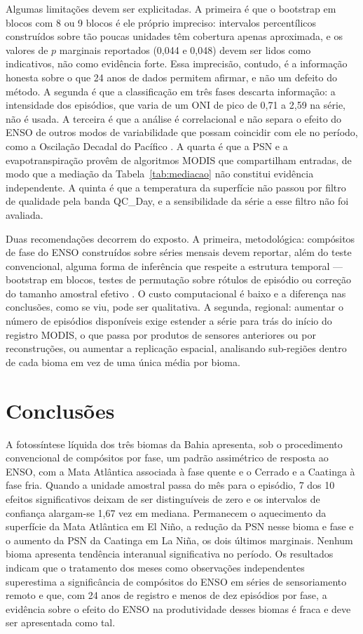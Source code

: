 \documentclass[a4paper,fleqn]{cas-sc}
\begin{document}
Algumas limitações devem ser explicitadas. A primeira é que o bootstrap em blocos com 8 ou 9 blocos é ele próprio impreciso: intervalos percentílicos construídos sobre tão poucas unidades têm cobertura apenas aproximada, e os valores de $p$ marginais reportados (0,044 e 0,048) devem ser lidos como indicativos, não como evidência forte. Essa imprecisão, contudo, é a informação honesta sobre o que 24 anos de dados permitem afirmar, e não um defeito do método. A segunda é que a classificação em três fases descarta informação: a intensidade dos episódios, que varia de um ONI de pico de 0,71 a 2,59 na série, não é usada. A terceira é que a análise é correlacional e não separa o efeito do ENSO de outros modos de variabilidade que possam coincidir com ele no período, como a Oscilação Decadal do Pacífico \citep{kayano2007}. A quarta é que a PSN e a evapotranspiração provêm de algoritmos MODIS que compartilham entradas, de modo que a mediação da Tabela~\ref{tab:mediacao} não constitui evidência independente. A quinta é que a temperatura da superfície não passou por filtro de qualidade pela banda QC\_Day, e a sensibilidade da série a esse filtro não foi avaliada.

Duas recomendações decorrem do exposto. A primeira, metodológica: compósitos de fase do ENSO construídos sobre séries mensais devem reportar, além do teste convencional, alguma forma de inferência que respeite a estrutura temporal --- bootstrap em blocos, testes de permutação sobre rótulos de episódio ou correção do tamanho amostral efetivo \citep{kunsch1989, politis1994}. O custo computacional é baixo e a diferença nas conclusões, como se viu, pode ser qualitativa. A segunda, regional: aumentar o número de episódios disponíveis exige estender a série para trás do início do registro MODIS, o que passa por produtos de sensores anteriores ou por reconstruções, ou aumentar a replicação espacial, analisando sub-regiões dentro de cada bioma em vez de uma única média por bioma.

\section{Conclusões}

A fotossíntese líquida dos três biomas da Bahia apresenta, sob o procedimento convencional de compósitos por fase, um padrão assimétrico de resposta ao ENSO, com a Mata Atlântica associada à fase quente e o Cerrado e a Caatinga à fase fria. Quando a unidade amostral passa do mês para o episódio, 7 dos 10 efeitos significativos deixam de ser distinguíveis de zero e os intervalos de confiança alargam-se 1,67 vez em mediana. Permanecem o aquecimento da superfície da Mata Atlântica em El Niño, a redução da PSN nesse bioma e fase e o aumento da PSN da Caatinga em La Niña, os dois últimos marginais. Nenhum bioma apresenta tendência interanual significativa no período. Os resultados indicam que o tratamento dos meses como observações independentes superestima a significância de compósitos do ENSO em séries de sensoriamento remoto e que, com 24 anos de registro e menos de dez episódios por fase, a evidência sobre o efeito do ENSO na produtividade desses biomas é fraca e deve ser apresentada como tal.
\end{document}

